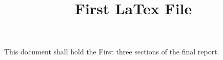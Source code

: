 \documentclass[12pt,A4paper]{article}
\author{}
\date{}
\begin{document}
	\title{First LaTex File}
	\maketitle
This document shall hold the First three sections of the final report.
\end{document}

